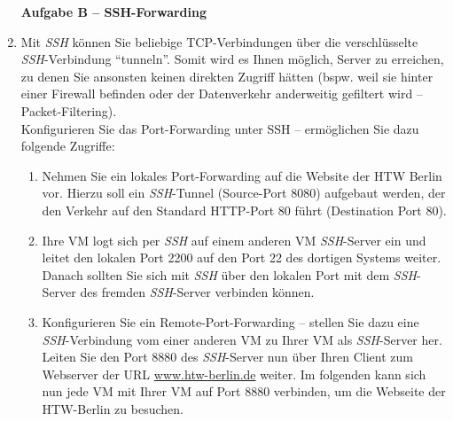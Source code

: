 \documentclass[paper=a4,fontsize=11pt]{scrartcl}%
\numberwithin{equation}{section}
\begin{document}
\begin{enumerate}
\begin{center}\Large{\textbf{Aufgabe B -- SSH-Forwarding}}\end{center}\vskip0.25in
	\item Mit \emph{SSH} können Sie beliebige TCP-Verbindungen über die verschlüsselte \emph{SSH}-Verbindung \enquote{tunneln}. Somit wird es Ihnen möglich, Server zu erreichen, zu denen Sie ansonsten keinen direkten Zugriff hätten (bspw. weil sie hinter einer Firewall befinden oder der Datenverkehr anderweitig gefiltert wird -- Packet-Filtering).\\
	Konfigurieren Sie das Port-Forwarding unter SSH -- ermöglichen Sie dazu folgende Zugriffe:
	\begin{enumerate}
		\item Nehmen Sie ein lokales Port-Forwarding auf die Website der HTW Berlin vor. Hierzu soll ein \emph{SSH}-Tunnel (Source-Port 8080) aufgebaut werden, der den Verkehr auf den Standard HTTP-Port 80 führt (Destination Port 80).
		\item Ihre VM logt sich per \emph{SSH} auf einem anderen VM \emph{SSH}-Server ein und leitet den lokalen Port 2200 auf den Port 22 des dortigen Systems weiter. Danach sollten Sie sich mit \emph{SSH} über den lokalen Port mit dem \emph{SSH}-Server des fremden \emph{SSH}-Server verbinden können.
		\item Konfigurieren Sie ein Remote-Port-Forwarding -- stellen Sie dazu eine \emph{SSH}-Verbindung vom einer anderen VM zu Ihrer VM als \emph{SSH}-Server her. Leiten Sie den Port 8880 des \emph{SSH}-Server nun über Ihren Client zum Webserver der URL \url{www.htw-berlin.de} weiter. Im folgenden kann sich nun jede VM mit Ihrer VM auf Port 8880 verbinden, um die Webseite der HTW-Berlin zu besuchen.
	\end{enumerate}
\end{enumerate}
\end{document}

